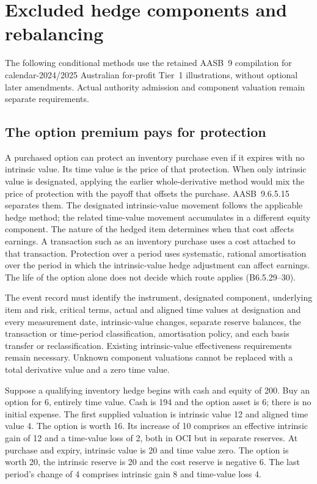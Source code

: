 \hypertarget{excluded-hedge-components-and-rebalancing}{%
\section{Excluded hedge components and rebalancing}\label{excluded-hedge-components-and-rebalancing}}

The following conditional methods use the retained AASB~9 compilation for calendar-2024/2025 Australian for-profit Tier~1 illustrations, without optional later amendments. Actual authority admission and component valuation remain separate requirements.

\hypertarget{the-option-premium-pays-for-protection}{%
\subsection{The option premium pays for protection}\label{the-option-premium-pays-for-protection}}

A purchased option can protect an inventory purchase even if it expires with no intrinsic value. Its time value is the price of that protection. When only intrinsic value is designated, applying the earlier whole-derivative method would mix the price of protection with the payoff that offsets the purchase. AASB~9.6.5.15 \citep[6.5.15 and B6.5.29--33]{aasb9dated} separates them. The designated intrinsic-value movement follows the applicable hedge method; the related time-value movement accumulates in a different equity component. The nature of the hedged item determines when that cost affects earnings. A transaction such as an inventory purchase uses a cost attached to that transaction. Protection over a period uses systematic, rational amortisation over the period in which the intrinsic-value hedge adjustment can affect earnings. The life of the option alone does not decide which route applies (B6.5.29--30).

The event record must identify the instrument, designated component, underlying item and risk, critical terms, actual and aligned time values at designation and every measurement date, intrinsic-value changes, separate reserve balances, the transaction or time-period classification, amortisation policy, and each basis transfer or reclassification. Existing intrinsic-value effectiveness requirements remain necessary. Unknown component valuations cannot be replaced with a total derivative value and a zero time value.

Suppose a qualifying inventory hedge begins with cash and equity of 200. Buy an option for 6, entirely time value. Cash is 194 and the option asset is 6; there is no initial expense. The first supplied valuation is intrinsic value 12 and aligned time value 4. The option is worth 16. Its increase of 10 comprises an effective intrinsic gain of 12 and a time-value loss of 2, both in OCI but in separate reserves. At purchase and expiry, intrinsic value is 20 and time value zero. The option is worth 20, the intrinsic reserve is 20 and the cost reserve is negative 6. The last period's change of 4 comprises intrinsic gain 8 and time-value loss 4.

